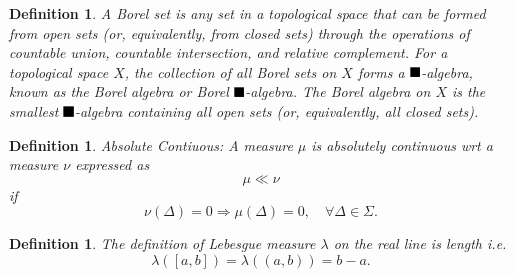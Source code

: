 \documentclass[aps,preprint]{revtex4}%
\providecommand{\U}[1]{\protect\rule{.1in}{.1in}}
\newtheorem{definition}[theorem]{Definition}
\begin{document}
\begin{definition}
A \emph{Borel set }is any set in a topological space that can be formed from
\emph{open sets} (or, equivalently, from closed sets) through the operations
of countable union, countable intersection, and relative complement. For a
topological space $X$, the collection of all Borel sets on $X$ forms a
$\U{3c3} $-algebra, known as the \emph{Borel algebra} or \emph{Borel }$\U{3c3}
$\emph{-algebra}. The \emph{Borel algebra} on $X$ is the smallest $\U{3c3}
$-algebra containing all open sets (or, equivalently, all closed sets).
\end{definition}

\begin{definition}
Absolute Contiuous: A measure $\mu$ is absolutely continuous wrt a measure
$\nu$ expressed as
\begin{equation}
\mu\ll\nu
\end{equation}
if
\begin{equation}
\nu\left(  \Delta\right)  =0\Rightarrow\mu\left(  \Delta\right)
=0,\quad\forall\Delta\in\Sigma.
\end{equation}

\end{definition}

\begin{definition}
The definition of \emph{Lebesgue measure} $\lambda$ on the real line is length
i.e.
\begin{equation}
\lambda\left(  \left[  a,b\right]  \right)  =\lambda\left(  \left(
a,b\right)  \right)  =b-a.
\end{equation}

\end{definition}
\end{document}
